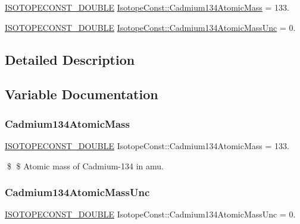 \begin{DoxyCompactItemize}
\item 
\mbox{\hyperlink{group___isotope_const-_macros_ga8f45a7272ce02c0b4c65c44636ed719a}{I\+S\+O\+T\+O\+P\+E\+C\+O\+N\+S\+T\+\_\+\+D\+O\+U\+B\+LE}} \mbox{\hyperlink{group___isotope_const-_cadmium-_cd134_gad471e2a146dd21e8514a7d9303ad67d8}{Isotope\+Const\+::\+Cadmium134\+Atomic\+Mass}} = 133.
\item 
\mbox{\hyperlink{group___isotope_const-_macros_ga8f45a7272ce02c0b4c65c44636ed719a}{I\+S\+O\+T\+O\+P\+E\+C\+O\+N\+S\+T\+\_\+\+D\+O\+U\+B\+LE}} \mbox{\hyperlink{group___isotope_const-_cadmium-_cd134_ga305f1705ee46f914e740c41ccfbc4fd0}{Isotope\+Const\+::\+Cadmium134\+Atomic\+Mass\+Unc}} = 0.
\end{DoxyCompactItemize}


\subsection{Detailed Description}


\subsection{Variable Documentation}
\mbox{\label{group___isotope_const-_cadmium-_cd134_gad471e2a146dd21e8514a7d9303ad67d8}} 
\subsubsection{\texorpdfstring{Cadmium134\+Atomic\+Mass}{Cadmium134AtomicMass}}
{\footnotesize\ttfamily \mbox{\hyperlink{group___isotope_const-_macros_ga8f45a7272ce02c0b4c65c44636ed719a}{I\+S\+O\+T\+O\+P\+E\+C\+O\+N\+S\+T\+\_\+\+D\+O\+U\+B\+LE}} Isotope\+Const\+::\+Cadmium134\+Atomic\+Mass = 133.}

\$ \$ Atomic mass of Cadmium-\/134 in amu. \mbox{\label{group___isotope_const-_cadmium-_cd134_ga305f1705ee46f914e740c41ccfbc4fd0}} 
\subsubsection{\texorpdfstring{Cadmium134\+Atomic\+Mass\+Unc}{Cadmium134AtomicMassUnc}}
{\footnotesize\ttfamily \mbox{\hyperlink{group___isotope_const-_macros_ga8f45a7272ce02c0b4c65c44636ed719a}{I\+S\+O\+T\+O\+P\+E\+C\+O\+N\+S\+T\+\_\+\+D\+O\+U\+B\+LE}} Isotope\+Const\+::\+Cadmium134\+Atomic\+Mass\+Unc = 0.}

